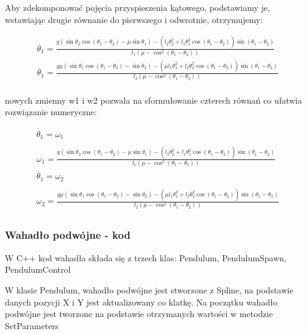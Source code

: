 \documentclass[a4paper,12pt,reqno]{article}
\begin{document}
Aby zdekomponować pojęcia przyspieszenia kątowego, podstawiamy je, wstawiając drugie równanie do pierwszego i odwrotnie, otrzymujemy: 

\begin{equation}
\begin{split} 
\ddot{\theta_1}=\frac{g(\sin\theta_2\cos(\theta_1-\theta_2)-\mu\sin\theta_1)
-(l_2\dot{\theta_2^2}+l_1\dot{\theta_1^2}\cos(\theta_1-\theta_2))\sin(\theta_1-\theta_2)}{l_1(\mu-\cos^2(\theta_1-\theta_2))}
\\
\ddot{\theta_1}=\frac{g\mu(\sin\theta_1\cos(\theta_1-\theta_2)-\sin\theta_2)
-(\mu l_1\dot{\theta_1^2}+l_2\dot{\theta_2^2}\cos(\theta_1-\theta_2))\sin(\theta_1-\theta_2)}
{l_2(\mu-\cos^2(\theta_1-\theta_2))}
\\
\end{split}
\end{equation}


 nowych zmienny w1 i w2 pozwala na sformułowanie czterech równań co ułatwia rozwiązanie numeryczne:
 
 
\begin{equation}
\begin{split} 
\dot{\theta_1}=\omega_1\\\\
\omega_1=\frac{g(\sin\theta_2\cos(\theta_1-\theta_2)-\mu\sin\theta_1)
-(l_2\dot{\theta_2^2}+l_1\dot{\theta_1^2}\cos(\theta_1-\theta_2))\sin(\theta_1-\theta_2)}{l_1(\mu-\cos^2(\theta_1-\theta_2))}
\\
\dot{\theta_1}=\omega_2\\\\
\omega_2=\frac{g\mu(\sin\theta_1\cos(\theta_1-\theta_2)-\sin\theta_2)
-(\mu l_1\dot{\theta_1^2}+l_2\dot{\theta_2^2}\cos(\theta_1-\theta_2))\sin(\theta_1-\theta_2)}
{l_2(\mu-\cos^2(\theta_1-\theta_2))}
\\
\end{split}
\label{computeAnglesEuler}
\end{equation}


\subsubsection{Wahadło podwójne - kod}


W C++ kod wahadła składa się z trzech klas: Pendulum, PendulumSpawn, PendulumControl

W klasie Pendulum, wahadło podwójne jest stworzone z Spline, na podstawie danych pozycji X i Y jest aktualizowany co klatkę. Na początku wahadło podwójne jest tworzone na podstawie otrzymanych wartości w metodzie SetParameters
\end{document}
